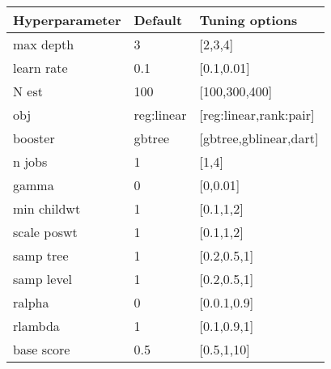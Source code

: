 
\begin{tabular}{|l|l|l|} 
\hline
\textbf{Hyperparameter}& \textbf{Default} & \textbf{Tuning options}\\
\hline
max depth & 3 & [2,3,4]\\
\hline
learn rate & 0.1 & [0.1,0.01] \\
\hline
N est & 100 & [100,300,400] \\
\hline
obj & reg:linear & [reg:linear,rank:pair] \\
\hline
booster &gbtree& [gbtree,gblinear,dart] \\
\hline
n jobs & 1& [1,4]\\
\hline
gamma & 0 & [0,0.01] \\
\hline
min childwt & 1& [0.1,1,2] \\
\hline
scale poswt & 1& [0.1,1,2] \\
\hline
samp tree & 1& [0.2,0.5,1]\\
\hline
samp level & 1& [0.2,0.5,1]\\
\hline
ralpha & 0& [0.0.1,0.9] \\
\hline
rlambda & 1& [0.1,0.9,1] \\
\hline
base score & 0.5& [0.5,1,10] \\
\hline
\end{tabular}

